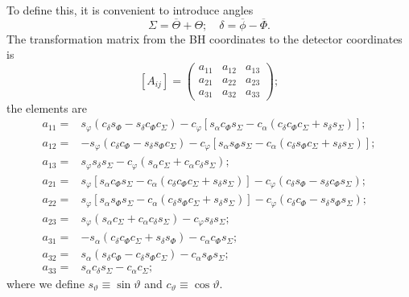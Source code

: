 \documentclass[a4paper, 11pt, titlepage, twoside]{report}
\begin{document}
To define this, it is convenient to introduce angles
\begin{equation}
\Sigma = \overline{\Theta} + \Theta; \quad \delta = \overline{\phi} - \overline{\Phi}.
\end{equation}
The transformation matrix from the BH coordinates to the detector coordinates is
\begin{equation}
\left[A_{ij}\right] = \begin{pmatrix}
a_{11} & a_{12} & a_{13} \\
a_{21} & a_{22} & a_{23} \\
a_{31} & a_{32} & a_{33}
\end{pmatrix};
\end{equation}
the elements are
\begin{align}
a_{11} = {} & s_\varphi\left(c_\delta s_\Phi - s_\delta c_\Phi c_\Sigma\right) - c_\varphi \left[s_\alpha c_\Phi s_\Sigma - c_\alpha \left(c_\delta c_\Phi c_\Sigma + s_\delta s_\Sigma\right)\right]; \\
a_{12} = {} & -s_\varphi\left(c_\delta c_\Phi - s_\delta s_\Phi c_\Sigma\right) - c_\varphi \left[s_\alpha s_\Phi s_\Sigma - c_\alpha \left(c_\delta s_\Phi c_\Sigma + s_\delta s_\Sigma\right)\right]; \\
a_{13} = {} & s_\varphi s_\delta s_\Sigma - c_\varphi\left(s_\alpha c_\Sigma + c_\alpha c_\delta s_\Sigma\right); \\
a_{21} = {} & s_\varphi\left[s_\alpha c_\Phi s_\Sigma - c_\alpha \left(c_\delta c_\Phi c_\Sigma + s_\delta s_\Sigma\right)\right] - c_\varphi \left(c_\delta s_\Phi - s_\delta c_\Phi s_\Sigma\right); \\
a_{22} = {} & s_\varphi\left[s_\alpha s_\Phi s_\Sigma - c_\alpha \left(c_\delta s_\Phi c_\Sigma + s_\delta s_\Sigma\right)\right] - c_\varphi \left(c_\delta c_\Phi - s_\delta s_\Phi s_\Sigma\right); \\
a_{23} = {} & s_\varphi\left(s_\alpha c_\Sigma + c_\alpha c_\delta s_\Sigma\right) - c_\varphi s_\delta s_\Sigma; \\
a_{31} = {} & -s_\alpha\left(c_\delta c_\Phi c_\Sigma + s_\delta s_\Phi\right) - c_\alpha c_\Phi s_\Sigma; \\
a_{32} = {} & s_\alpha\left(s_\delta c_\Phi - c_\delta s_\Phi c_\Sigma\right) - c_\alpha s_\Phi s_\Sigma; \\
a_{33} = {} & s_\alpha c_\delta s_\Sigma - c_\alpha c_\Sigma;
\end{align}
where we define $s_\vartheta \equiv \sin \vartheta$ and $c_\vartheta \equiv \cos \vartheta$.
\end{document}
